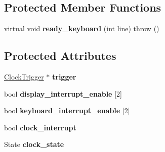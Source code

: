 \subsection*{Protected Member Functions}
\begin{DoxyCompactItemize}
\item 
\hypertarget{classSpimConsoleDevice_a1d4e7b7cf74058b78b97c1b38989fb32}{
virtual void {\bfseries ready\_\-keyboard} (int line)  throw ()}
\label{classSpimConsoleDevice_a1d4e7b7cf74058b78b97c1b38989fb32}

\end{DoxyCompactItemize}
\subsection*{Protected Attributes}
\begin{DoxyCompactItemize}
\item 
\hypertarget{classSpimConsoleDevice_a9d198eda9fea1f785d1e1a5b6dee989f}{
\hyperlink{classSpimConsoleDevice_1_1ClockTrigger}{ClockTrigger} $\ast$ {\bfseries trigger}}
\label{classSpimConsoleDevice_a9d198eda9fea1f785d1e1a5b6dee989f}

\item 
\hypertarget{classSpimConsoleDevice_a4f18e808134f6316b56414af76ef5166}{
bool {\bfseries display\_\-interrupt\_\-enable} \mbox{[}2\mbox{]}}
\label{classSpimConsoleDevice_a4f18e808134f6316b56414af76ef5166}

\item 
\hypertarget{classSpimConsoleDevice_ac630afbba920b08a99d58abac7ee8db0}{
bool {\bfseries keyboard\_\-interrupt\_\-enable} \mbox{[}2\mbox{]}}
\label{classSpimConsoleDevice_ac630afbba920b08a99d58abac7ee8db0}

\item 
\hypertarget{classSpimConsoleDevice_ad7800f8b1f3f8901eb442ec9b43e4d44}{
bool {\bfseries clock\_\-interrupt}}
\label{classSpimConsoleDevice_ad7800f8b1f3f8901eb442ec9b43e4d44}

\item 
\hypertarget{classSpimConsoleDevice_a1151ad9401979e409f63d3ce3cb2747f}{
State {\bfseries clock\_\-state}}
\label{classSpimConsoleDevice_a1151ad9401979e409f63d3ce3cb2747f}

\end{DoxyCompactItemize}
